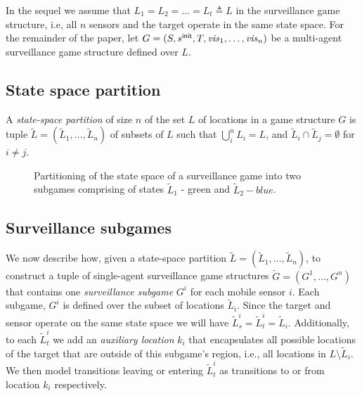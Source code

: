 In the sequel we assume that $L_1 = L_2 = \dots = L_t \triangleq L$  in the surveillance game structure, i.e, all $n$ sensors and the target operate in the same state space. For the remainder of the paper, let $G=(S,s^{\mathsf{init}},T,\mathit{vis}_1,\ldots,\mathit{vis}_n)$ be a multi-agent surveillance game structure  defined over  $L$.
\subsection{State space partition}
A  \emph{state-space partition} of size $n$ of the set $L$ of locations in a game structure $G$ is tuple $\widetilde L =  (\widetilde L_1,\ldots,\widetilde L_n)$ of subsets of $L$ such that  $\bigcup_i^n L_i = L $, and $\widetilde L_i \cap \widetilde L_j  = \emptyset$ for $i \neq j$. 


\begin{figure}
{}


\caption{Partitioning of the state space of a surveillance game into two subgames comprising of states $\widetilde{L}_1$ - green and $\widetilde{L}_2 - blue$. }
\label{fig:simple-dist-game}
\end{figure}

\subsection{Surveillance subgames}
We now describe how, given a state-space partition $\widetilde L =  (\widetilde L_1,\ldots,\widetilde L_n)$, to construct a tuple of single-agent surveillance game structures $\widetilde G = (G^1,\ldots,G^n)$ that contains one  \emph{surveillance subgame} $G^i$ for each mobile sensor  $i$. Each subgame, $G^i$ is defined over the subset of locations $\widetilde{L}_i$. Since the target and sensor operate on the same state space we will have $\widetilde{L}^i_s = \widetilde{L}^i_t = \widetilde{L}_i$. Additionally, to each $\widetilde{L}^i_t$ we add an \emph{auxiliary location} $k_i$ that encapsulates all possible locations of the target that are outside of this subgame's region, i.e., all locations in $L \setminus \widetilde{L}_i$.  We then model transitions leaving or entering $\widetilde{L}^i_t$ as transitions to or from location $k_i$ respectively.

